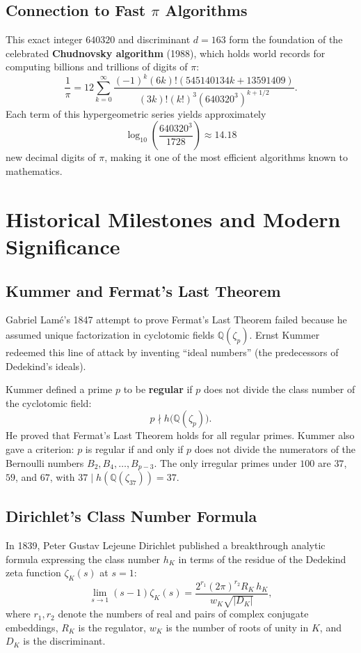 \documentclass[a4paper]{article}
\begin{document}
\subsection{Connection to Fast \texorpdfstring{$\pi$}{pi} Algorithms}
This exact integer $640320$ and discriminant $d = 163$ form the foundation of the celebrated \textbf{Chudnovsky algorithm} (1988), which holds world records for computing billions and trillions of digits of $\pi$:
\begin{equation}
 \frac{1}{\pi} = 12 \sum_{k=0}^{\infty} \frac{(-1)^k (6k)! (545140134k + 13591409)}{(3k)! (k!)^3 \left(640320^3\right)^{k + 1/2}}.
\end{equation}
Each term of this hypergeometric series yields approximately
\begin{equation}
 \log_{10}\left(\frac{640320^3}{1728}\right) \approx 14.18
\end{equation}
new decimal digits of $\pi$, making it one of the most efficient algorithms known to mathematics.

\section{Historical Milestones and Modern Significance}
\label{sec:milestones}

\subsection{Kummer and Fermat's Last Theorem}
Gabriel Lam\'e's 1847 attempt to prove Fermat's Last Theorem failed because he assumed unique factorization in cyclotomic fields $\mathbb{Q}(\zeta_p)$. Ernst Kummer redeemed this line of attack by inventing ``ideal numbers'' (the predecessors of Dedekind's ideals).

Kummer defined a prime $p$ to be \textbf{regular} if $p$ does not divide the class number of the cyclotomic field:
\begin{equation}
 p \nmid h\big(\mathbb{Q}(\zeta_p)\big).
\end{equation}
He proved that Fermat's Last Theorem holds for all regular primes. Kummer also gave a criterion: $p$ is regular if and only if $p$ does not divide the numerators of the Bernoulli numbers $B_2, B_4, \dots, B_{p-3}$. The only irregular primes under $100$ are $37$, $59$, and $67$, with $37 \mid h(\mathbb{Q}(\zeta_{37})) = 37$.

\subsection{Dirichlet's Class Number Formula}
In 1839, Peter Gustav Lejeune Dirichlet published a breakthrough analytic formula expressing the class number $h_K$ in terms of the residue of the Dedekind zeta function $\zeta_K(s)$ at $s = 1$:
\begin{equation}
 \lim_{s \to 1} (s - 1)\zeta_K(s) = \frac{2^{r_1} (2\pi)^{r_2} R_K \, h_K}{w_K \sqrt{|D_K|}},
\end{equation}
where $r_1, r_2$ denote the numbers of real and pairs of complex conjugate embeddings, $R_K$ is the regulator, $w_K$ is the number of roots of unity in $K$, and $D_K$ is the discriminant.
\end{document}
